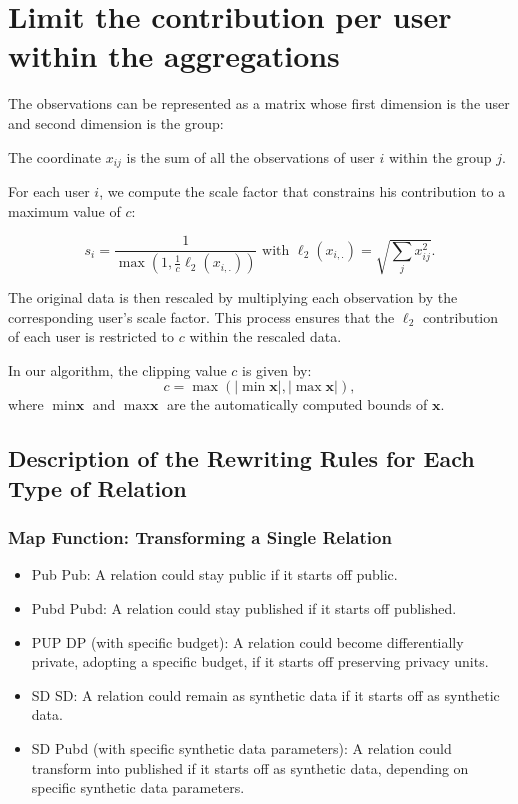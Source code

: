 \documentclass[letterpaper]{article} %
\begin{document}
\section*{Limit the contribution per user within the aggregations}
\label{sec:limit_contrib_per_user}

The observations can be represented as a matrix whose first dimension is the user
and second dimension is the group:

The coordinate $x_{ij}$ is the sum of all the observations of user $i$ within the group $j$.

For each user $i$, we compute the scale factor that constrains his contribution to a maximum value of $c$:

\begin{equation}
	s_i = \frac{1}{\max ( 1, \frac{1}{c} \ell_2(x_{i,.}) )} \text{  with  } \ell_2(x_{i,.}) = \sqrt{\sum_j x^2_{ij}}.
\end{equation}

The original data is then rescaled by multiplying each observation by the corresponding user's scale factor.
This process ensures that the $\ell_2$ contribution of each user is restricted to $c$ within the rescaled data.

In our algorithm, the clipping value $c$ is given by:
\begin{equation}
    c = \max ( |\min \textbf{x}|, |\max \textbf{x}|),
\end{equation}
where $\min \textbf{x}$ and $\max \textbf{x}$ are the automatically computed bounds of $\textbf{x}$.

\bigskip
\subsection*{Description of the Rewriting Rules for Each Type of Relation}
\label{sec:rewriting_rules}

\subsubsection*{Map Function: Transforming a Single Relation}
\begin{itemize}
    \item Pub \textrightarrow{} Pub: A relation could stay public if it starts off public.
    \item Pubd \textrightarrow{} Pubd: A relation could stay published if it starts off published.
    \item PUP \textrightarrow{} DP (with specific budget): A relation could become differentially private, adopting a specific budget, if it starts off preserving privacy units.
    \item SD \textrightarrow{} SD: A relation could remain as synthetic data if it starts off as synthetic data.
    \item SD \textrightarrow{} Pubd (with specific synthetic data parameters): A relation could transform into published if it starts off as synthetic data, depending on specific synthetic data parameters.
\end{itemize}
\end{document}
